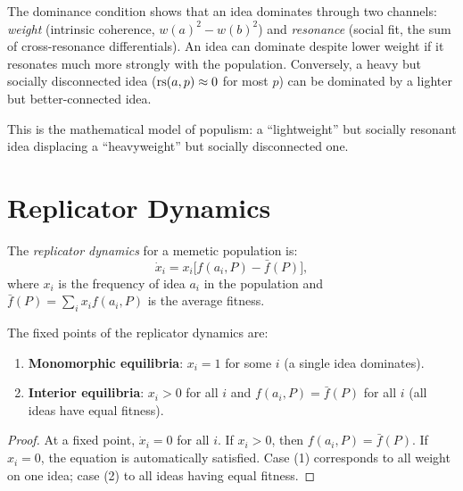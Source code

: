 \begin{interpretation}
\label{interp:heavy-dominates}
The dominance condition shows that an idea dominates through two channels:
\emph{weight} (intrinsic coherence, $w(a)^2 - w(b)^2$) and \emph{resonance}
(social fit, the sum of cross-resonance differentials).  An idea can dominate
despite lower weight if it resonates much more strongly with the population.
Conversely, a heavy but socially disconnected idea ($\mathrm{rs}(a, p) \approx 0$
for most $p$) can be dominated by a lighter but better-connected idea.

This is the mathematical model of populism: a ``lightweight'' but
socially resonant idea displacing a ``heavyweight'' but socially disconnected one.
\end{interpretation}


\section{Replicator Dynamics}

\begin{definition}
\label{def:replicator}
The \emph{replicator dynamics} for a memetic population is:
\[
  \dot{x}_i = x_i \bigl[f(a_i, P) - \bar{f}(P)\bigr],
\]
where $x_i$ is the frequency of idea $a_i$ in the population and
$\bar{f}(P) = \sum_i x_i f(a_i, P)$ is the average fitness.
\end{definition}

\begin{theorem}
\label{thm:replicator-fixed}
The fixed points of the replicator dynamics are:
\begin{enumerate}
  \item \textbf{Monomorphic equilibria}: $x_i = 1$ for some $i$
        (a single idea dominates).
  \item \textbf{Interior equilibria}: $x_i > 0$ for all $i$ and
        $f(a_i, P) = \bar{f}(P)$ for all $i$ (all ideas have equal fitness).
\end{enumerate}
\end{theorem}

\begin{proof}
At a fixed point, $\dot{x}_i = 0$ for all $i$.  If $x_i > 0$, then
$f(a_i, P) = \bar{f}(P)$.  If $x_i = 0$, the equation is automatically
satisfied.  Case (1) corresponds to all weight on one idea; case (2) to all
ideas having equal fitness.
\end{proof}

